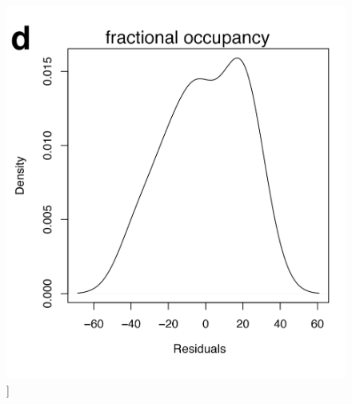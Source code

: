\documentclass[phd,tocprelim]{cornell}
\renewcommand{\caption}[1]{\singlespacing\hangcaption{#1}\normalspacing}
\begin{document}
\null
\vfill
\clearpage
\null
\vfill
\begin{figure}[h!]
		\ContinuedFloat
		\captionsetup{labelformat=adja-page}
    \centering
    \includegraphics[width=1\textwidth]{chapter2/SupplementaryFig13d.png}
    \caption[]{}
\end{figure}
\null
\vfill
\clearpage
\end{document}
